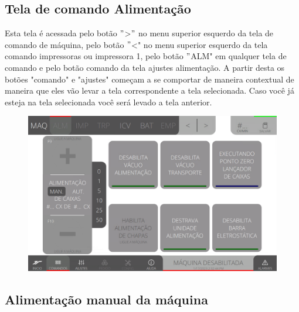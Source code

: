 \newpage
\thispagestyle{fancy}
\vspace{\fill}
\subsection{Tela de comando Alimentação}
Esta tela é acessada pelo botão \("\)\textgreater\("\) no menu superior esquerdo da tela de comando de máquina, pelo botão \("\)\textless{}" no menu superior esquerdo da tela comando impressoras ou impressora 1, pelo botão \("\)ALM" em qualquer tela de comando e pelo botão comando da tela ajustes alimentação. A partir desta os botões "comando" e "ajustes" começam a se comportar de maneira contextual de maneira que eles vão levar a tela correspondente a tela selecionada. Caso você já esteja na tela selecionada você será levado a tela anterior.
\vspace*{10pt}

\begin{figure}
    \centering
    \includegraphics[width=480 px,height=300 px]{src/imagesICV/03-feeder/commands/1.png}
\end{figure}
\newpage
\thispagestyle{fancy}
\vspace{\fill}

\subsection{Alimentação manual da máquina}

